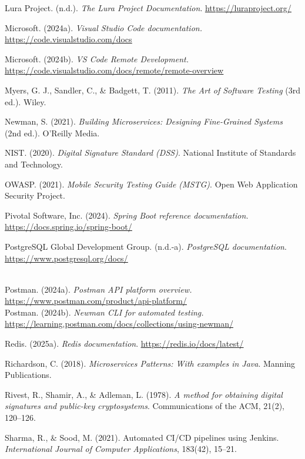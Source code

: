 Lura Project. (n.d.). \emph{The Lura Project Documentation}.
\href{https://luraproject.org/}{\ul{https://luraproject.org/}}

Microsoft. (2024a). \emph{Visual Studio Code documentation.}
\href{https://code.visualstudio.com/docs}{\ul{https://code.visualstudio.com/docs}}

Microsoft. (2024b). \emph{VS Code Remote Development.}
\href{https://code.visualstudio.com/docs/remote/remote-overview}{\ul{https://code.visualstudio.com/docs/remote/remote-overview}}

Myers, G. J., Sandler, C., \& Badgett, T. (2011). \emph{The Art of
Software Testing} (3rd ed.). Wiley.

Newman, S. (2021). \emph{Building Microservices: Designing Fine-Grained
Systems} (2nd ed.). O'Reilly Media.

NIST. (2020). \emph{Digital Signature Standard (DSS)}. National
Institute of Standards and Technology.

OWASP. (2021). \emph{Mobile Security Testing Guide (MSTG)}. Open Web
Application Security Project.

Pivotal Software, Inc. (2024). \emph{Spring Boot reference
documentation.}
\href{https://docs.spring.io/spring-boot/}{\ul{https://docs.spring.io/spring-boot/}}

PostgreSQL Global Development Group. (n.d.-a). \emph{PostgreSQL
documentation}.
\href{https://www.postgresql.org/docs/}{\ul{https://www.postgresql.org/docs/}}\\
\strut \\
Postman. (2024a). \emph{Postman API platform overview.}
\href{https://www.postman.com/product/api-platform/}{\ul{https://www.postman.com/product/api-platform/}}\\
Postman. (2024b). \emph{Newman CLI for automated testing.}
\href{https://learning.postman.com/docs/collections/using-newman/}{\ul{https://learning.postman.com/docs/collections/using-newman/}}

Redis. (2025a). \emph{Redis documentation}.
\href{https://redis.io/docs/latest/}{\ul{https://redis.io/docs/latest/}}

Richardson, C. (2018). \emph{Microservices Patterns: With examples in
Java}. Manning Publications.

Rivest, R., Shamir, A., \& Adleman, L. (1978). \emph{A method for
obtaining digital signatures and public-key cryptosystems}.
Communications of the ACM, 21(2), 120--126.

Sharma, R., \& Sood, M. (2021). Automated CI/CD pipelines using Jenkins.
\emph{International Journal of Computer Applications}, 183(42), 15--21.

